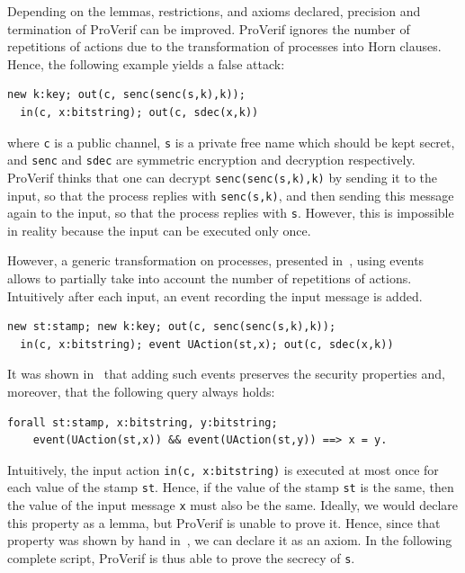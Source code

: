 \documentclass{book}
\begin{document}
Depending on the lemmas, restrictions, and axioms declared, precision and termination of ProVerif can be improved. ProVerif ignores the number of repetitions of actions due to the transformation of processes into Horn clauses. Hence, the following example yields a false attack:
\begin{lstlisting}[numbers=none]
  new k:key; out(c, senc(senc(s,k),k));
  in(c, x:bitstring); out(c, sdec(x,k))
\end{lstlisting}
where \lstinline!c! is a public channel, \lstinline!s! is a private
free name which should be kept secret, and
\lstinline!senc! and \lstinline!sdec! are symmetric
encryption and decryption respectively.
ProVerif thinks that one can decrypt \lstinline!senc(senc(s,k),k)! by sending
it to the input, so that the process replies with \lstinline!senc(s,k)!,
and then sending this message again to the input, so that the process
replies with \lstinline!s!. However, this is impossible in reality
because the input can be executed only once.

However, a generic transformation on processes, presented in~\cite{CCT-csf18}, using events allows to partially take into account the number of repetitions of actions. Intuitively after each input, an event recording the input message is added.
\begin{lstlisting}[numbers=none]
  new st:stamp; new k:key; out(c, senc(senc(s,k),k));
  in(c, x:bitstring); event UAction(st,x); out(c, sdec(x,k))
\end{lstlisting}
It was shown in~\cite{CCT-csf18} that adding such events preserves the security properties and, moreover, that the following query always holds:
\begin{lstlisting}[numbers=none]
  forall st:stamp, x:bitstring, y:bitstring;
  	event(UAction(st,x)) && event(UAction(st,y)) ==> x = y.
\end{lstlisting}
Intuitively, the input action \lstinline!in(c, x:bitstring)! is executed
at most once for each value of the stamp \lstinline!st!. Hence,
if the value of the stamp \lstinline!st! is the same, then the value of the input message \lstinline!x! must also be the same.
Ideally, we would declare this property as a lemma, but ProVerif is unable to prove it. Hence, since that property was shown by hand in~\cite{CCT-csf18}, we can declare it as an axiom. In the following complete script, ProVerif is thus able to prove the secrecy of \lstinline!s!.


\end{document}
